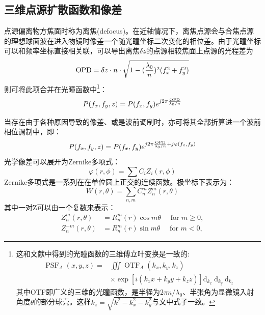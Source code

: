 \documentclass[draft=false,oneside]{fduthesis}
\begin{document}
    \subsection{三维点源扩散函数和像差}
    点源偏离物方焦面时称为离焦(defocus)。在近轴情况下，离焦点源会与合焦点源的理想球面波在进入物镜时像差一个随光瞳坐标二次变化的相位差。由于光瞳坐标可以和频率坐标直接相关联，可以导出离焦$\delta z$的点源相较焦面上点源的光程差为
    \begin{equation}
        \textup{OPD}=\delta z\cdot n\cdot \sqrt{1-(\frac{\lambda_0}{n})^2(f_x^2+f_y^2)}
    \end{equation}
    则可将此项合并在光瞳函数中\footnote{
        这和文献\cite{mccutchenGeneralizedApertureThreeDimensional1964}中得到的光瞳函数的三维傅立叶变换是一致的:
        \begin{equation}
            \begin{aligned}
                \operatorname{PSF}_{A}(x, y, z)= & \iiint \operatorname{OTF}_{A}\left(k_{x}, k_{y}, k_{z}\right) \\
                & \times \exp \left[i\left(k_{x} x+k_{y} y+k_{z} z\right)\right] \mathrm{d}_{k_{x}} \mathrm{~d}_{k_{y}} \mathrm{~d}_{k_{z}}
            \end{aligned}
        \end{equation}
        其中OTF即广义的三维的光瞳函数，是半径为$2\pi n/\lambda_0$、半张角为显微镜入射角度$\theta$的部分球壳。这样$k_z=\sqrt{k^2-k_x^2-k_y^2}$与文中式子一致。
    }：
    \begin{equation}
        P(f_x,f_y,z)=P(f_x,f_y)e^{j2\pi\frac{\textup{OPD}}{\lambda_0/n}}
        \label{z_pupil}
    \end{equation}
    \par 当存在由于各种原因导致的像差、或是波前调制时，亦可将其全部折算进一个波前相位调制中，即：
    \begin{equation}
        P(f_x,f_y,z)=P(f_x,f_y)e^{j2\pi\frac{\textup{OPD}}{\lambda_0/n}+j\varphi(f_x,f_y)}
    \end{equation}
    光学像差可以展开为Zernike多项式：
    \begin{equation}
        \varphi(r,\phi)=\sum C_iZ_i(r,\phi)
    \end{equation}
    Zernike多项式是一系列在在单位圆上正交的连续函数。极坐标下表示为：
    \begin{equation}
        W(r,\theta)=\sum_{n,m}C_n^m Z_n^m(r,\theta)
    \end{equation}
    其中一对Z可以由一个复数来表示：
    \begin{equation}
        \begin{aligned}
            Z_{n}^{m}(r, \theta) & =R_{n}^{m}(r) \cos m \theta \quad \text { for } m \geq 0, \\
            Z_{n}^{-m}(r, \theta) & =R_{n}^{m}(r) \sin m \theta \quad \text { for } m<0,
            \end{aligned}
    \end{equation}
\end{document}
